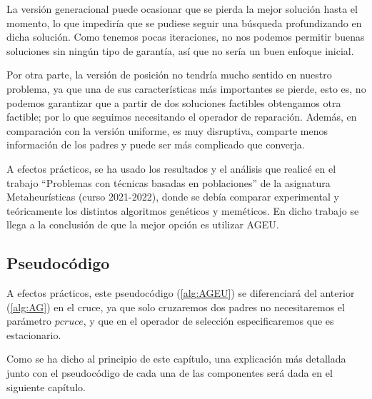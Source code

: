 La versión generacional puede ocasionar que se pierda la mejor solución hasta el momento, lo que impediría que se pudiese seguir una búsqueda profundizando en dicha solución. 
Como tenemos pocas iteraciones, no nos podemos permitir buenas soluciones sin ningún tipo de garantía, así que no sería un buen enfoque inicial. 

Por otra parte, la versión de posición no tendría mucho sentido en nuestro problema, ya que una de sus características más importantes se pierde, esto es, no podemos garantizar que a partir de dos soluciones factibles obtengamos otra factible; por lo que seguimos necesitando el operador de reparación. 
Además, en comparación con la versión uniforme, es muy disruptiva, comparte menos información de los padres y puede ser más complicado que converja. 

A efectos prácticos, se ha usado los resultados y el análisis que realicé en el trabajo ``Problemas con técnicas basadas en poblaciones'' de la asignatura Metaheurísticas (curso 2021-2022), donde se debía comparar experimental y teóricamente los distintos algoritmos genéticos y meméticos. 
En dicho trabajo se llega a la conclusión de que la mejor opción es utilizar AGEU.

\subsection{Pseudocódigo}

A efectos prácticos, este pseudocódigo (\ref{alg:AGEU}) se diferenciará del anterior (\ref{alg:AG}) en el cruce, ya que solo cruzaremos dos padres no necesitaremos el parámetro $pcruce$, y que en el operador de selección especificaremos que es estacionario. 

Como se ha dicho al principio de este capítulo, una explicación más detallada junto con el pseudocódigo de cada una de las componentes será dada en el siguiente capítulo.

